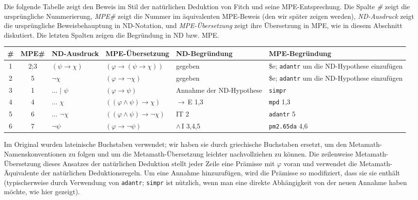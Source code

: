 Die folgende Tabelle zeigt den Beweis im Stil der natürlichen Deduktion von Fitch und seine MPE-Entsprechung. Die Spalte \textit{\#} zeigt die ursprüngliche Nummerierung, \textit{MPE\#} zeigt die Nummer im äquivalenten MPE-Beweis (den wir später zeigen werden), \textit{ND-Ausdruck} zeigt die ursprüngliche Beweisbehauptung in ND-Notation, und \textit{MPE-Übersetzung} zeigt ihre Übersetzung in MPE, wie in diesem Abschnitt diskutiert. Die letzten Spalten zeigen die Begründung in ND bzw. MPE.

{\setlength{\extrarowsep}{4pt} %
\begin{longtabu}   { @{} c c X X X X }
\textbf{\#} & \textbf{MPE\#} & \textbf{ND-Ausdruck} &
\textbf{MPE-Über\-setzung} & \textbf{ND-Begrün\-dung} &
\textbf{MPE-Begrün\-dung} \\
\endhead

1 & 2;3 &
$( \psi \rightarrow \chi )$ &
$( \varphi \rightarrow ( \psi \rightarrow \chi ) )$ &
gegeben &
\$e; \texttt{adantr} um die ND-Hypothese einzufügen \\

2 & 5 &
$ \lnot \chi$ &
$( \varphi \rightarrow \lnot \chi )$ &
gegeben &
\$e; \texttt{adantr} um die ND-Hypothese einzufügen \\

3 & 1 &
... $\vert$ $\psi$ &
$( \varphi \rightarrow \psi )$ &
Annahme der ND-Hypothese &
\texttt{simpr} \\

4 & 4 &
... $\chi$ &
$( ( \varphi \land \psi ) \rightarrow \chi )$ &
$\rightarrow$\,E 1,3 &
\texttt{mpd} 1,3 \\

5 & 6 &
... $\lnot \chi$ &
$( ( \varphi \land \psi ) \rightarrow \lnot \chi )$ &
IT 2 &
\texttt{adantr} 5 \\

6 & 7 &
$\lnot \psi$ &
$( \varphi \rightarrow \lnot \psi )$ &
$\land$\,I 3,4,5 &
\texttt{pm2.65da} 4,6 \\

\end{longtabu}
}


Im Original wurden lateinische Buchstaben verwendet; wir haben sie durch griechische Buchstaben ersetzt, um den Metamath-Namenskonventionen zu folgen und um die Metamath-Übersetzung leichter nachvollziehen zu können. Die zeilenweise Metamath-Übersetzung dieses Ansatzes der natürlichen Deduktion stellt jeder Zeile eine Prämisse mit $\varphi$ voran und verwendet die Metamath-Äquivalente der natürlichen Deduktionsregeln. Um eine Annahme hinzuzufügen, wird die Prämisse so modifiziert, dass sie sie enthält (typischerweise durch Verwendung von \texttt{adantr}; \texttt{simpr} ist nützlich, wenn man eine direkte Abhängigkeit von der neuen Annahme haben möchte, wie hier gezeigt).

